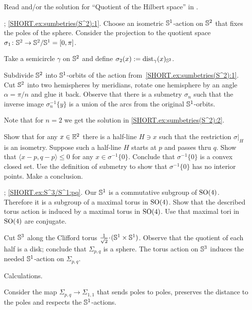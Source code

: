  Read \cite[Section 4]{terng-thorbergsson} and/or the solution for ``Quotient of the Hilbert space'' in \cite{petrunin2020}.

\parbf{\ref{ex:sumbetries(S^2)}}; \ref{SHORT.ex:sumbetries(S^2):1}.
Choose an isometric $\mathbb{S}^1$-action on $\mathbb{S}^2$ that fixes the poles of the sphere.
Consider the projection to the quotient space $\sigma_1\:\SSS^2\z\to \SSS^2/\SSS^1=[0,\pi]$.



Take a semicircle $\gamma$ on $\mathbb{S}^2$ and define
$\sigma_2(x)\mathrel{:=}\mathrm{dist}_\gamma(x)_{\mathbb{S}^2}$.

Subdivide $\mathbb{S}^2$ into $\mathbb{S}^1$-orbits of the action from~\ref{SHORT.ex:sumbetries(S^2):1}.
Cut $\mathbb{S}^2$ into two hemispheres by meridians, rotate one hemisphere by an angle $\alpha=\pi/n$ and glue it back.
Observe that there is a submetry $\sigma_n$ such that the inverse image $\sigma_n^{-1}\{y\}$ is a union of the arcs from the original $\mathbb{S}^1$-orbits.

Note that for $n=2$ we get the solution in \ref{SHORT.ex:sumbetries(S^2):2}.

Show that for any $x\in\mathbb{E}^2$ there is a half-line $H\ni x$ such that 
the restriction $\sigma|_H$ is an isometry.
Suppose such a half-line $H$ starts at $p$ and passes thru $q$.
Show that $\langle x-p,q-p \rangle\le 0$ for any $x\in \sigma^{-1}\{0\}$.
Conclude that $\sigma^{-1}\{0\}$ is a convex closed set.
Use the definition of submetry to show that $\sigma^{-1}\{0\}$ has no interior points.
Make a conclusion.

\parbf{\ref{ex:S^3/S^1}};
\ref{SHORT.ex:S^3/S^1:pq}.
Our $\mathbb{S}^1$ is a commutative subgroup of $\mathrm{SO}(4)$.
Therefore it is a subgroup of a maximal torus in $\mathrm{SO}(4)$.
Show that the described torus action is induced by a maximal torus in $\mathrm{SO}(4)$.
Use that maximal tori in $\mathrm{SO}(4)$ are conjugate.

Cut $\mathbb{S}^3$ along the Clifford torus $\tfrac1{\sqrt2}\cdot (\SSS^1\times \SSS^1)$.
Observe that the quotient of each half is a disk;
conclude that $\Sigma_{p,q}$ is a sphere.
The torus action on $\mathbb{S}^3$ induces the needed $\mathbb{S}^1$-action on $\Sigma_{p,q}$.

 Calculations.

Consider the map $\Sigma_{p,q}\to\Sigma_{1,1}$ that sends poles to poles,
preserves the distance to the poles and respects the $\mathbb{S}^1$-actions.

